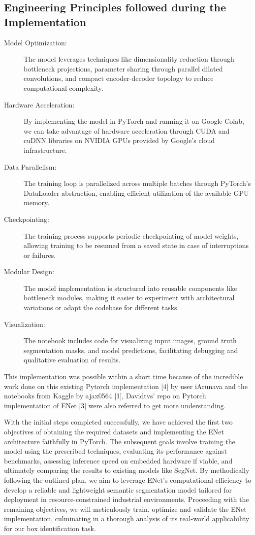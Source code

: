 \subsection{Engineering Principles followed during the Implementation}
\begin{description}
	\item[Model Optimization:] The model leverages techniques like dimensionality reduction through bottleneck projections, parameter sharing through parallel dilated convolutions, and compact encoder-decoder topology to reduce computational complexity.
	\item[Hardware Acceleration:] By implementing the model in PyTorch and running it on Google Colab, we can take advantage of hardware acceleration through CUDA and cuDNN libraries on NVIDIA GPUs provided by Google's cloud infrastructure.
	\item[Data Parallelism:] The training loop is parallelized across multiple batches through PyTorch's DataLoader abstraction, enabling efficient utilization of the available GPU memory.
	\item[Checkpointing:] The training process supports periodic checkpointing of model weights, allowing training to be resumed from a saved state in case of interruptions or failures.
	\item[Modular Design:] The model implementation is structured into reusable components like bottleneck modules, making it easier to experiment with architectural variations or adapt the codebase for different tasks.
	\item[Visualization:] The notebook includes code for visualizing input images, ground truth segmentation masks, and model predictions, facilitating debugging and qualitative evaluation of results.
\end{description}

This implementation was possible within a short time because of the incredible work done on this existing Pytorch implementation [4] by user iArunava and the notebooks from Kaggle by ajax0564 [1], Davidtvs' repo on Pytorch implementation of ENet [3] were also referred to get more understanding.

With the initial steps completed successfully, we have achieved the first two objectives of obtaining the required datasets and implementing the ENet architecture faithfully in PyTorch. The subsequent goals involve training the model using the prescribed techniques, evaluating its performance against benchmarks, assessing inference speed on embedded hardware if viable, and ultimately comparing the results to existing models like SegNet. By methodically following the outlined plan, we aim to leverage ENet's computational efficiency to develop a reliable and lightweight semantic segmentation model tailored for deployment in resource-constrained industrial environments. Proceeding with the remaining objectives, we will meticulously train, optimize and validate the ENet implementation, culminating in a thorough analysis of its real-world applicability for our box identification task.
